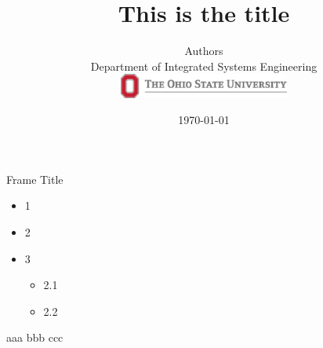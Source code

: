\documentclass{beamer}
\title{This is the title}
\author[Authors]{Authors\\
Department of Integrated Systems Engineering \\
\vspace{1cm}
\includegraphics[height=0.8cm]{Figures/OSU_logo.eps}}
\date{\today}
\begin{document}
\begin{frame}[plain]
    \maketitle 
\end{frame}








\begin{frame}{Frame Title}
    \begin{itemize}
    \item 1
    \item 2
    \item 3
    \begin{itemize}
      \item 2.1
      \item 2.2
    \end{itemize}
  \end{itemize}
  \begin{theorem}
    aaa bbb ccc
  \end{theorem}
\end{frame}
\end{document}

